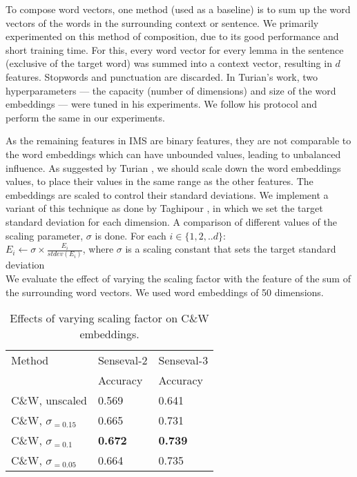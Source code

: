 To compose word vectors, one method (used as a baseline) is to sum up
the word vectors of the words in the surrounding context or
sentence. We primarily experimented on this method of composition, due
to its good performance and short training time. For this, every word
vector for every lemma in the sentence (exclusive of the target word)
was summed into a context vector, resulting in $d$ features. Stopwords
and punctuation are discarded. In Turian's
 work, two hyperparameters ---
the capacity (number of dimensions) and size of the word embeddings
--- were tuned in his experiments. We follow his protocol and perform
the same in our experiments.

As the remaining features in IMS are binary features, they are not
comparable to the word embeddings which can have unbounded values,
leading to unbalanced influence.  As suggested by Turian
, we should scale down the word
embeddings values, to place their values in the same range as the
other features. The embeddings are scaled to control their standard
deviations. We implement a variant of this technique as done by
Taghipour , in which we set the target standard
deviation for each dimension. A comparison of different values of the
scaling parameter, $\sigma$ is done. For each $i \in \{1, 2, .. d\}$:
\\

$E_{i} \leftarrow \sigma \times \frac{E_{i}}{stdev(E_{i})} $, where
$\sigma$ is a scaling constant that sets the target standard deviation
\\

We evaluate the effect of varying the scaling factor with the feature
of the sum of the surrounding word vectors. We used word embeddings of 50
dimensions.

\begin{table}[th]
	\caption{Effects of varying scaling factor on C\&W embeddings.}
	\label{table:wordembeddings-accuracy}
	\begin{center}
		\begin{tabular}{| p{7cm} | p{3.5cm} | p{3.5cm} |}
			\hline
			Method & Senseval-2 & Senseval-3 \\
     		 	   &  Accuracy &  Accuracy \\
			\hline
			C\&W, unscaled & 0.569 & 0.641 \\
			\hline
			C\&W, $\sigma _{=0.15}$ & 0.665 & 0.731 \\
			\hline
			C\&W, $\sigma _{=0.1}$ & {\bf0.672} & {\bf0.739} \\
			\hline
			C\&W, $\sigma _{=0.05}$ & 0.664 & 0.735 \\
			\hline
		\end{tabular}
	\end{center}
\end{table}

